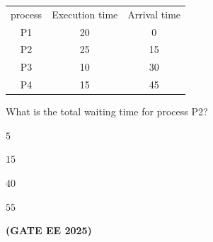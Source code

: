 \documentclass[journal,12pt,onecolumn]{IEEEtran}
\theoremstyle{remark}
\begin{document}
\begin {center}
\begin{enumerate}
\begin{tabular}{c c c}
   
     process & Execution time & Arrival time\\
     P1 & 20 & 0 \\
     P2 & 25  & 15 \\
     P3 & 10 & 30 \\
     P4 & 15 & 45 \\
      \end{tabular}  
      \newline
      What is the total waiting time for process P2?
      \begin{enumerate}
          \begin{multicols}{4}
          \item $5$
          \item $15$
          \item $40$
          \item $55$
              
          \end{multicols}
      \end{enumerate}
\hfill \textbf{(GATE EE 2025)}
 

\end{enumerate}
\end{center}
\end{document}

